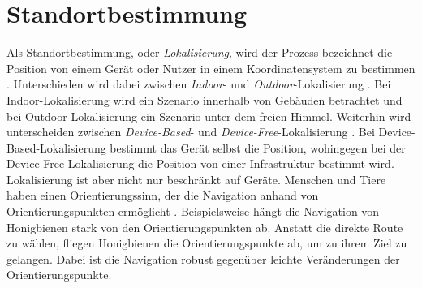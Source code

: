 \chapter{Standortbestimmung}
Als Standortbestimmung, oder \textit{Lokalisierung}, wird der Prozess bezeichnet die Position von einem Gerät oder Nutzer in einem Koordinatensystem zu bestimmen \cite{bulusu2000gps}.
Unterschieden wird dabei zwischen \textit{Indoor}- und \textit{Outdoor}-Lokalisierung \cite{zafari2019survey, bulusu2000gps}.
Bei Indoor-Lokalisierung wird ein Szenario innerhalb von Gebäuden betrachtet und bei Outdoor-Lokalisierung ein Szenario unter dem freien Himmel.
\newline
\newline
Weiterhin wird unterscheiden zwischen \textit{Device-Based}- und \textit{Device-Free}-Lokalisierung \cite{xiao2016survey}.
Bei Device-Based-Lokalisierung bestimmt das Gerät selbst die Position, wohingegen bei der Device-Free-Lokalisierung
die Position von einer Infrastruktur bestimmt wird.
\newline
\newline
Lokalisierung ist aber nicht nur beschränkt auf Geräte.
Menschen und Tiere haben einen Orientierungssinn, der die Navigation anhand von Orientierungspunkten ermöglicht \cite{menzel1996knowledge}.
Beispielsweise hängt die Navigation von Honigbienen stark von den Orientierungspunkten ab.
Anstatt die direkte Route zu wählen, fliegen Honigbienen die Orientierungspunkte ab, um zu ihrem Ziel zu gelangen.
Dabei ist die Navigation robust gegenüber leichte Veränderungen der Orientierungspunkte.





